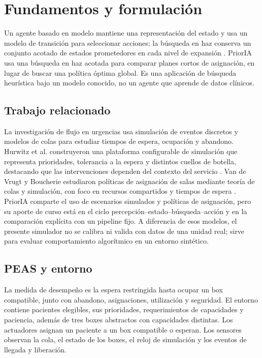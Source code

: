 \documentclass[conference]{IEEEtran}
\begin{document}
\section{Fundamentos y formulación}
Un agente basado en modelo mantiene una representación del estado y usa un modelo de transición para seleccionar acciones; la búsqueda en haz conserva un conjunto acotado de estados prometedores en cada nivel de expansión \cite{russell2021aima}. PriorIA usa una búsqueda en haz acotada para comparar planes cortos de asignación, en lugar de buscar una política óptima global. Es una aplicación de búsqueda heurística bajo un modelo conocido, no un agente que aprende de datos clínicos.

\subsection{Trabajo relacionado}
La investigación de flujo en urgencias usa simulación de eventos discretos y modelos de colas para estudiar tiempos de espera, ocupación y abandono. Hurwitz et al. construyeron una plataforma configurable de simulación que representa prioridades, tolerancia a la espera y distintos cuellos de botella, destacando que las intervenciones dependen del contexto del servicio \cite{hurwitz2014}. Van de Vrugt y Boucherie estudiaron políticas de asignación de salas mediante teoría de colas y simulación, con foco en recursos compartidos y tiempos de espera \cite{vandevrugt2016}. PriorIA comparte el uso de escenarios simulados y políticas de asignación, pero su aporte de curso está en el ciclo percepción--estado--búsqueda--acción y en la comparación explícita con un pipeline fijo. A diferencia de esos modelos, el presente simulador no se calibra ni valida con datos de una unidad real; sirve para evaluar comportamiento algorítmico en un entorno sintético.

\subsection{PEAS y entorno}
La medida de desempeño es la espera restringida hasta ocupar un box compatible, junto con abandono, asignaciones, utilización y seguridad. El entorno contiene pacientes elegibles, sus prioridades, requerimientos de capacidades y paciencia, además de tres boxes abstractos con capacidades distintas. Los actuadores asignan un paciente a un box compatible o esperan. Los sensores observan la cola, el estado de los boxes, el reloj de simulación y los eventos de llegada y liberación.
\end{document}
